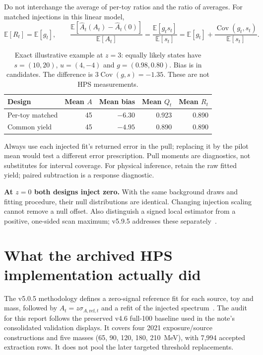 \documentclass[11pt]{article}
\newcommand{\E}{\mathbb E}
\newcommand{\Cov}{\operatorname{Cov}}
\newcommand{\Ah}{\widehat A}
\begin{document}
Do not interchange the average of per-toy ratios and the ratio of averages.
For matched injections in this linear model,
\begin{equation}
 \E[R_t]=\E[g_t],\qquad
 \frac{\E[\Ah_t(A_t)-\Ah_t(0)]}{\E[A_t]}
 =\frac{\E[g_t s_t]}{\E[s_t]}
 =\E[g_t]+\frac{\Cov(g_t,s_t)}{\E[s_t]}.
\end{equation}

\begin{table}[H]\centering\small
\begin{tabular}{lrrrr}
\toprule
Design & Mean $A$ & Mean bias & Mean $Q_t$ & Mean $R_t$\\
\midrule
Per-toy matched & 45 & $-6.30$ & 0.923 & 0.890\\
Common yield & 45 & $-4.95$ & 0.890 & 0.890\\
\bottomrule
\end{tabular}
\caption{Exact illustrative example at $z=3$: equally likely states have
$s=(10,20)$, $u=(4,-4)$ and $g=(0.98,0.80)$. Bias is in candidates.
The difference is $3\Cov(g,s)=-1.35$. These are not HPS measurements.}
\end{table}

Always use each injected fit's returned error in the pull; replacing it by
the pilot mean would test a different error prescription. Pull moments are
diagnostics, not substitutes for interval coverage. For physical inference,
retain the raw fitted yield; paired subtraction is a response diagnostic.

\textbf{At $z=0$ both designs inject zero.} With the same background draws
and fitting procedure, their null distributions are identical. Changing
injection scaling cannot remove a null offset. Also distinguish a signed
local estimator from a positive, one-sided scan maximum; v5.9.5 addresses
these separately~\cite{nullstudy}.

\clearpage
\section{What the archived HPS implementation actually did}
The v5.0.5 methodology defines a zero-signal reference fit for each source,
toy and mass, followed by $A_t=z\sigma_{A,\mathrm{ref},t}$ and a refit of
the injected spectrum~\cite{note}. The audit for this report follows the
preserved v4.6 full-100 baseline used in the note's consolidated validation
displays. It covers four 2021 exposure/source constructions and five masses
(65, 90, 120, 180, 210~MeV), with 7,994 accepted extraction rows.
It does not pool the later targeted threshold replacements.
\end{document}
